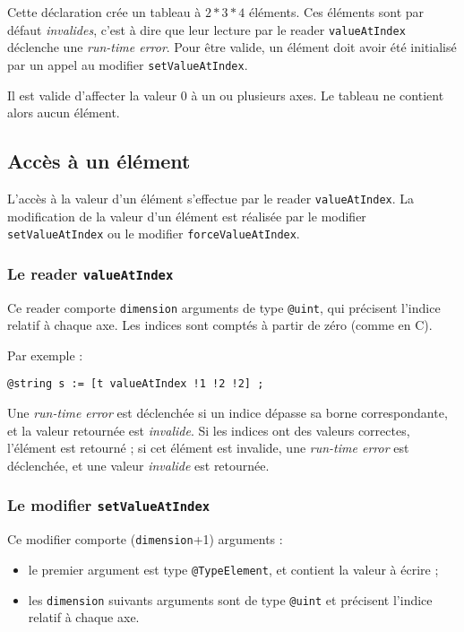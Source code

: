 Cette déclaration crée un tableau à $2*3*4$ éléments. Ces éléments sont par défaut \emph{invalides}, c'est à dire que leur lecture par le reader \lstinline[language=galgas]!valueAtIndex! déclenche une \emph{run-time error}. Pour être valide, un élément doit avoir été initialisé par un appel au modifier \lstinline[language=galgas]!setValueAtIndex!.

Il est valide d'affecter la valeur $0$ à un ou plusieurs axes. Le tableau ne contient alors aucun élément.


\subsection{Accès à un élément}

L'accès à la valeur d'un élément s'effectue par le reader \lstinline[language=galgas]!valueAtIndex!. La modification de la valeur d'un élément est réalisée par le modifier \lstinline[language=galgas]!setValueAtIndex! ou le modifier \lstinline[language=galgas]!forceValueAtIndex!.

\subsubsection{Le reader \lstinline[language=galgas]!valueAtIndex!}

Ce reader comporte \lstinline[language=galgas]!dimension! arguments de type \lstinline[language=galgas]!@uint!, qui précisent l'indice relatif à chaque axe. Les indices sont comptés à partir de zéro (comme en C).

Par exemple :
\begin{lstlisting}[language=galgas]
  @string s := [t valueAtIndex !1 !2 !2] ;
\end{lstlisting}


Une \emph{run-time error} est déclenchée si un indice dépasse sa borne correspondante, et la valeur retournée est \emph{invalide}. Si les indices ont des valeurs correctes, l'élément est retourné ; si cet élément est invalide, une \emph{run-time error} est déclenchée, et une valeur \emph{invalide} est retournée.






\subsubsection{Le modifier \lstinline[language=galgas]!setValueAtIndex!}

Ce modifier comporte (\lstinline[language=galgas]!dimension!+1) arguments :
\begin{itemize}
  \item le premier argument est type \lstinline[language=galgas]!@TypeElement!, et contient la valeur à écrire ;
  \item les \lstinline[language=galgas]!dimension! suivants arguments sont de type \lstinline[language=galgas]!@uint! et précisent l'indice relatif à chaque axe.
\end{itemize} 
  
